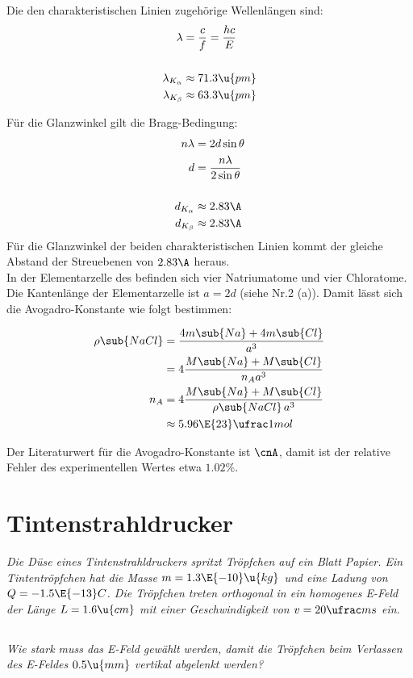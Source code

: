 \documentclass[ex,minted,hatbasis]{exercise_4.0}
\begin{document}
Die den charakteristischen Linien zugehörige Wellenlängen sind:
\begin{align*}
    \lambda &= \frac cf = \frac{hc}{E}\\
    \\
    \lambda_{K_\alpha} &\approx 71.3\u{pm}\\
    \lambda_{K_\beta} &\approx 63.3\u{pm}
\end{align*}

Für die Glanzwinkel gilt die Bragg-Bedingung:
\begin{align*}
    n\lambda &= 2d \sin\theta\\
    d &= \frac{n\lambda}{2\sin\theta}\\
    \\
    d_{K_\alpha} &\approx 2.83\A\\
    d_{K_\beta} &\approx 2.83\A
\end{align*}
Für die Glanzwinkel der beiden charakteristischen Linien kommt der gleiche Abstand der Streuebenen von $2.83\A$ heraus. \\

In der Elementarzelle des  befinden sich vier Natriumatome und vier Chloratome. Die Kantenlänge der Elementarzelle ist $a=2d$ (siehe Nr.2 (a)). Damit lässt sich die Avogadro-Konstante wie folgt bestimmen:

\begin{align*}
    \rho\sub{NaCl} &= \frac{4m\sub{Na} + 4m\sub{Cl}}{a^3} \\
    &= 4\frac{M\sub{Na} + M\sub{Cl}}{n_A a^3} \\
    n_A &= 4\frac{M\sub{Na} + M\sub{Cl}}{\rho\sub{NaCl} \,a^3} \\
    &\approx 5.96\E{23} \ufrac1{mol}
\end{align*}

Der Literaturwert für die Avogadro-Konstante ist $\cnA$, damit ist der relative Fehler des experimentellen Wertes etwa \(1.02\%\).


\section{Tintenstrahldrucker}
{\it Die Düse eines Tintenstrahldruckers spritzt Tröpfchen auf ein Blatt Papier. Ein Tintentröpfchen hat die Masse $m = 1.3\E{-10}\u{kg}$ und eine Ladung von $Q = -1.5 \E{-13} C$. Die Tröpfchen treten orthogonal in ein homogenes E-Feld der Länge $L = 1.6 \u{cm}$ mit einer Geschwindigkeit von $v = 20 \ufrac ms$ ein.}

\subsection{}
{\it Wie stark muss das E-Feld gewählt werden, damit die Tröpfchen beim Verlassen des E-Feldes $0.5 \u{mm}$ vertikal abgelenkt werden?}\vspace{2ex}
\end{document}
